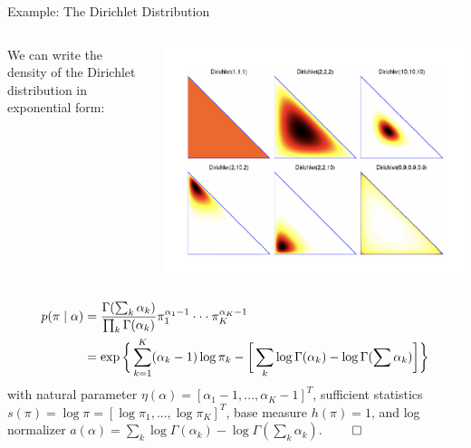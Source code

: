 \documentclass[10pt]{beamer}
\begin{document}
\begin{frame}{Example: The Dirichlet Distribution}


\begin{columns}
\begin{column}{.6\textwidth}
We can write the density of the Dirichlet distribution in exponential form:
\end{column}
\begin{column}{.35\textwidth}
\includegraphics[width=\textwidth]{images/dirichlet}
\end{column}
\end{columns}
\begin{align*}
p (\pi \; | \;\alpha) &= \displaystyle\frac{\Gamma(\sum_k \alpha_k)}{\prod_k \Gamma (\alpha_k) } \pi_1^{\alpha_1 -1} \cdot \cdot \cdot \pi_K^{\alpha_K -1} \\
&= \exp \bigg\{ \sum_{k=1}^K (\alpha_k -1) \log \pi_k - \bigg[ \sum_k \log \Gamma (\alpha_k)-  \log \Gamma (\sum \alpha_k) \bigg]  \bigg\}
\end{align*}
with natural parameter $\eta(\alpha) = [\alpha_1 -1, ..., \alpha_K -1]^T$, sufficient statistics $s(\pi) = \log \pi = [\log \pi_1, ..., \log \pi_K]^T$, base measure $h(\pi)=1$, and log normalizer $a(\alpha) =  \sum_k \log \Gamma (\alpha_k ) - \log \Gamma (\sum_k \alpha_k)$. $\qed$
\end{frame}
\end{document}
